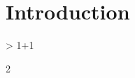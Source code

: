 \documentclass{article}
\begin{document}


\section{Introduction}

\begin{Schunk}
\begin{Sinput}
> 1+1
\end{Sinput}
\begin{Soutput}
[1] 2
\end{Soutput}
\end{Schunk}
\end{document}
